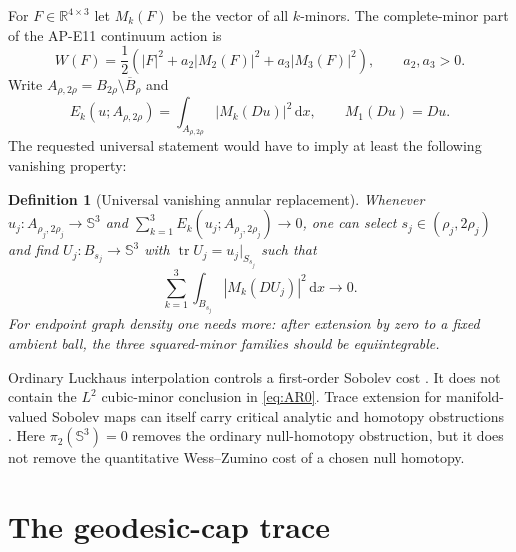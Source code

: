 \documentclass[11pt]{article}
\newtheorem{definition}[theorem]{Definition}
\newcommand{\dd}{\,\mathrm d}
\newcommand{\RR}{\mathbb R}
\newcommand{\SSS}{\mathbb S}
\begin{document}
For $F\in\RR^{4\times3}$ let $M_k(F)$ be the vector of all $k$-minors.  The
complete-minor part of the AP-E11 continuum action is
\begin{equation}
 W(F)=\frac12\left(|F|^2+a_2|M_2(F)|^2+a_3|M_3(F)|^2\right),
 \qquad a_2,a_3>0.
 \label{eq:density}
\end{equation}
Write $A_{\rho,2\rho}=B_{2\rho}\setminus\overline B_\rho$ and
\begin{equation}
 E_k(u;A_{\rho,2\rho})=
 \int_{A_{\rho,2\rho}}|M_k(Du)|^2\dd x,
 \qquad M_1(Du)=Du.
 \label{eq:shell-energy}
\end{equation}
The requested universal statement would have to imply at least the following
vanishing property:

\begin{definition}[Universal vanishing annular replacement]
Whenever $u_j:A_{\rho_j,2\rho_j}\to\SSS^3$ and
$\sum_{k=1}^3E_k(u_j;A_{\rho_j,2\rho_j})\to0$, one can select
$s_j\in(\rho_j,2\rho_j)$ and find
$U_j:B_{s_j}\to\SSS^3$ with
$\operatorname{tr}U_j=u_j|_{S_{s_j}}$ such that
\begin{equation}
 \sum_{k=1}^3\int_{B_{s_j}}|M_k(DU_j)|^2\dd x\longrightarrow0.
 \label{eq:AR0}
\end{equation}
For endpoint graph density one needs more: after extension by zero to a fixed
ambient ball, the three squared-minor families should be equiintegrable.
\end{definition}

Ordinary Luckhaus interpolation controls a first-order Sobolev cost
\cite{Luckhaus1988}.  It does not contain the $L^2$ cubic-minor conclusion in
\eqref{eq:AR0}.  Trace extension for manifold-valued Sobolev maps can itself
carry critical analytic and homotopy obstructions \cite{MironescuVanSchaftingen2021}.
Here $\pi_2(\SSS^3)=0$ removes the ordinary null-homotopy obstruction, but it
does not remove the quantitative Wess--Zumino cost of a chosen null homotopy.

\section{The geodesic-cap trace}
\end{document}
